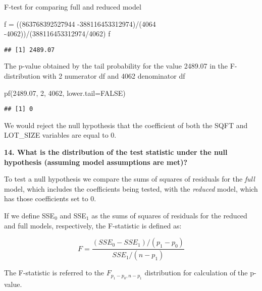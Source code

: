 \documentclass[
]{article}
\newenvironment{Shaded}{\begin{snugshade}}{\end{snugshade}}
\newcommand{\AttributeTok}[1]{\textcolor[rgb]{0.77,0.63,0.00}{#1}}
\newcommand{\ConstantTok}[1]{\textcolor[rgb]{0.00,0.00,0.00}{#1}}
\newcommand{\DecValTok}[1]{\textcolor[rgb]{0.00,0.00,0.81}{#1}}
\newcommand{\FloatTok}[1]{\textcolor[rgb]{0.00,0.00,0.81}{#1}}
\newcommand{\FunctionTok}[1]{\textcolor[rgb]{0.00,0.00,0.00}{#1}}
\newcommand{\NormalTok}[1]{#1}
\newcommand{\OtherTok}[1]{\textcolor[rgb]{0.56,0.35,0.01}{#1}}
\newcommand{\SpecialCharTok}[1]{\textcolor[rgb]{0.00,0.00,0.00}{#1}}
\begin{document}
F-test for comparing full and reduced model

\begin{Shaded}
\begin{Highlighting}[]
\NormalTok{f }\OtherTok{=}\NormalTok{ ((}\DecValTok{863768392527944} \SpecialCharTok{{-}}\DecValTok{388116453312974}\NormalTok{)}\SpecialCharTok{/}\NormalTok{(}\DecValTok{4064} \SpecialCharTok{{-}}\DecValTok{4062}\NormalTok{))}\SpecialCharTok{/}\NormalTok{(}\DecValTok{388116453312974}\SpecialCharTok{/}\DecValTok{4062}\NormalTok{)}
\NormalTok{f}
\end{Highlighting}
\end{Shaded}

\begin{verbatim}
## [1] 2489.07
\end{verbatim}

The p-value obtained by the tail probability for the value 2489.07 in
the F-distribution with 2 numerator df and 4062 denominator df

\begin{Shaded}
\begin{Highlighting}[]
\FunctionTok{pf}\NormalTok{(}\FloatTok{2489.07}\NormalTok{, }\DecValTok{2}\NormalTok{, }\DecValTok{4062}\NormalTok{, }\AttributeTok{lower.tail=}\ConstantTok{FALSE}\NormalTok{)}
\end{Highlighting}
\end{Shaded}

\begin{verbatim}
## [1] 0
\end{verbatim}

We would reject the null hypothesis that the coefficient of both the
SQFT and LOT\_SIZE variables are equal to 0.

\textbf{14. What is the distribution of the test statistic under the
null hypothesis (assuming model assumptions are met)?}

To test a null hypothesis we compare the sums of squares of residuals
for the \emph{full} model, which includes the coefficients being tested,
with the \emph{reduced} model, which has those coefficients set to 0.

If we define SSE\(_0\) and SSE\(_1\) as the sums of squares of residuals
for the reduced and full models, respectively, the F-statistic is
defined as:

\[
F=\frac{(SSE_0 - SSE_1)/(p_1-p_0)}{SSE_1/(n-p_1)}
\]

The F-statistic is referred to the \(F_{p_1-p_0,n-p_1}\) distribution
for calculation of the p-value.
\end{document}
